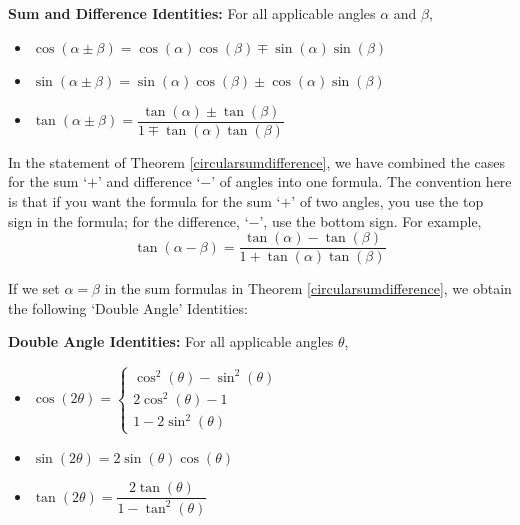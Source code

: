 \documentclass{ximera}
\begin{document}
\begin{theorem} \label{circularsumdifference}  \textbf{Sum and Difference Identities:} For all applicable angles $\alpha$ and $\beta$,      

\begin{itemize}

\item  $\cos(\alpha \pm \beta) = \cos(\alpha) \cos(\beta) \mp \sin(\alpha) \sin(\beta)$

\item  $\sin(\alpha \pm \beta) = \sin(\alpha) \cos(\beta) \pm \cos(\alpha) \sin(\beta)$

\item $\tan(\alpha \pm \beta) = \dfrac{\tan(\alpha) \pm \tan(\beta)}{1 \mp \tan(\alpha) \tan(\beta)}$

\end{itemize}

\end{theorem}

\smallskip


\smallskip

In the statement of Theorem \ref{circularsumdifference}, we have combined the cases for the sum `$+$' and difference `$-$' of angles into one formula.  The convention here is that if you want the formula for the sum `$+$' of two angles, you use the top sign in the formula;  for the difference, `$-$', use the bottom sign.  For example, \[\tan(\alpha - \beta) = \dfrac{\tan(\alpha) - \tan(\beta)}{1 + \tan(\alpha) \tan(\beta)}\]

If we set $\alpha = \beta$  in the sum formulas in Theorem \ref{circularsumdifference}, we obtain the following `Double Angle' Identities:

\smallskip


\begin{theorem} \label{doubleangle}  \textbf{Double Angle Identities:} For all applicable angles $\theta$, 

\begin{itemize}

\item  $\cos(2\theta) = \left\{ \begin{array}{l} \cos^{2}(\theta) - \sin^{2}(\theta)\\ [5pt]  2\cos^{2}(\theta) - 1 \\ [5pt] 1-2\sin^{2}(\theta) \end{array} \right.$

\item $\sin(2\theta) = 2\sin(\theta)\cos(\theta)$

\item  $\tan(2\theta) = \dfrac{2\tan(\theta)}{1 - \tan^{2}(\theta)}$

\end{itemize}

\end{theorem}
\end{document}
